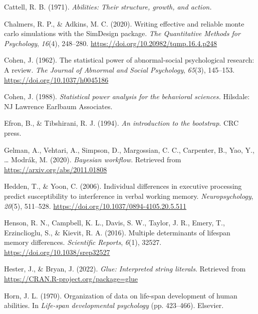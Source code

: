 \documentclass[
  man,floatsintext]{apa6}
\newlength{\cslhangindent}
\newlength{\cslentryspacingunit} %
\newenvironment{CSLReferences}[2] %
 {%
  \setlength{\parindent}{0pt}
  \ifodd #1
  \let\oldpar\par
  \def\par{\hangindent=\cslhangindent\oldpar}
  \fi
  \setlength{\parskip}{#2\cslentryspacingunit}
 }%
 {}
\begin{document}
\begin{CSLReferences}{1}{0}
\leavevmode{}%
Cattell, R. B. (1971). \emph{Abilities: Their structure, growth, and action.}

\leavevmode{}%
Chalmers, R. P., \& Adkins, M. C. (2020). Writing effective and reliable monte carlo simulations with the {SimDesign} package. \emph{The Quantitative Methods for Psychology}, \emph{16}(4), 248--280. \url{https://doi.org/10.20982/tqmp.16.4.p248}

\leavevmode{}%
Cohen, J. (1962). The statistical power of abnormal-social psychological research: A review. \emph{The Journal of Abnormal and Social Psychology}, \emph{65}(3), 145--153. \url{https://doi.org/10.1037/h0045186}

\leavevmode{}%
Cohen, J. (1988). \emph{Statistical power analysis for the behavioral sciences.} Hilsdale: {NJ} Lawrence Earlbaum Associates.

\leavevmode{}%
Efron, B., \& Tibshirani, R. J. (1994). \emph{An introduction to the bootstrap}. {CRC} press.

\leavevmode{}%
Gelman, A., Vehtari, A., Simpson, D., Margossian, C. C., Carpenter, B., Yao, Y., \ldots{} Modrák, M. (2020). \emph{Bayesian workflow}. Retrieved from \url{https://arxiv.org/abs/2011.01808}

\leavevmode{}%
Hedden, T., \& Yoon, C. (2006). Individual differences in executive processing predict susceptibility to interference in verbal working memory. \emph{Neuropsychology}, \emph{20}(5), 511--528. \url{https://doi.org/10.1037/0894-4105.20.5.511}

\leavevmode{}%
Henson, R. N., Campbell, K. L., Davis, S. W., Taylor, J. R., Emery, T., Erzinclioglu, S., \& Kievit, R. A. (2016). Multiple determinants of lifespan memory differences. \emph{Scientific Reports}, \emph{6}(1), 32527. \url{https://doi.org/10.1038/srep32527}

\leavevmode{}%
Hester, J., \& Bryan, J. (2022). \emph{Glue: Interpreted string literals}. Retrieved from \url{https://CRAN.R-project.org/package=glue}

\leavevmode{}%
Horn, J. L. (1970). Organization of data on life-span development of human abilities. In \emph{Life-span developmental psychology} (pp. 423--466). Elsevier.


\end{CSLReferences}
\end{document}
